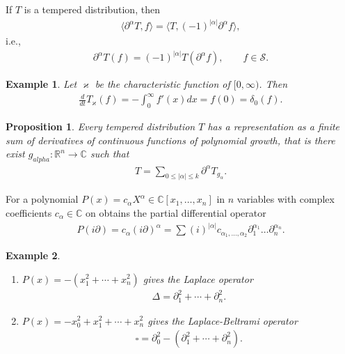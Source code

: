 \documentclass[a4paper,10pt]{amsart}
\newtheorem{example}{Example}[section]
\newtheorem{proposition}{Proposition}[section]
\newcommand{\SSS}{\mathcal S}
\newcommand{\C}{\mathbb C} %
\newcommand{\R}{\mathbb R}  %
\begin{document}
If $T$ is a tempered distribution, then
\begin{align*}
    \langle \partial^{\alpha}T, f \rangle = 
    \langle T, (-1)^{|\alpha|}\partial^{\alpha}f \rangle, 
\end{align*}
i.e., 
\begin{align*}
\partial^{\alpha}T(f) = (-1)^{|\alpha|}T(\partial^{\alpha}f), \qquad
    f \in \SSS.
\end{align*}

\begin{example}
    Let $\varkappa$ be the characteristic function of $[0, \infty)$. 
    Then
    \begin{align*}
        \frac{d}{dt}T_{\varkappa}(f) = -\int_{0}^{\infty}f'(x)dx = f(0)
        = \delta_{0}(f).
    \end{align*}
\end{example}

\begin{proposition}
   Every tempered distribution $T$ has a representation as a finite 
   sum of derivatives of continuous functions of polynomial growth, that
   is there exist $g_{alpha}: \R^{n} \to \C$ such that
   \begin{align*}
       T = \sum_{0 \leq |\alpha| \leq k}\partial^{\alpha}T_{g_{\alpha}}. 
   \end{align*}
\end{proposition}

For a polynomial $P(x) = c_{\alpha}X^{\alpha} \in \C[x_1, \ldots, x_n]$
in $n$ variables with complex coefficients $c_{\alpha} \in \C$ on obtains
the partial differential operator
\begin{align*}
   P(i\partial) = c_{\alpha}(i\partial)^{\alpha} 
   =\sum (i)^{|\alpha|}c_{\alpha_1, \ldots, \alpha_2}
   \partial_{1}^{\alpha_1} \ldots
\partial_{n}^{\alpha_n}.
\end{align*}

\begin{example}
   \begin{enumerate}
       \item $P(x) = -(x_{1}^{2} + \cdots + x^{2}_{n})$ gives the Laplace
           operator
           \begin{align*}
               \Delta = \partial^{2}_1 + \cdots + \partial^{2}_n. 
           \end{align*}
        \item $P(x) = -x^{2}_{0} + x^{2}_1 + \cdots + x^{2}_n$ gives the
            Laplace-Beltrami operator
            \begin{align*}
                \square = \partial_{0}^{2} 
                - (\partial^{2}_1 + \cdots + \partial^{2}_n).
            \end{align*}
   \end{enumerate} 
\end{example}
\end{document}
